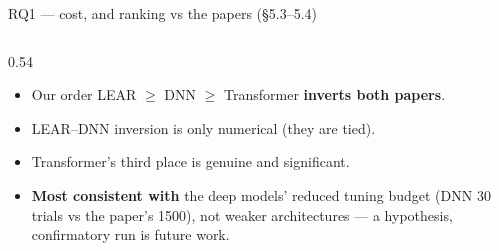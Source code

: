 \documentclass[aspectratio=169,10pt]{beamer}
\begin{document}
\begin{frame}{RQ1 --- cost, and ranking vs the papers \hfill\small(\S5.3--5.4)}
  \begin{columns}[T]
    \begin{column}{0.54\textwidth}
      \begin{itemize}\footnotesize
        \item Our order LEAR $\ge$ DNN $\ge$ Transformer \textbf{inverts both papers}.
        \item LEAR--DNN inversion is only numerical (they are tied).
        \item Transformer's third place is genuine and significant.
        \item \textbf{Most consistent with} the deep models' reduced tuning budget
          (DNN 30 trials vs the paper's 1500), not weaker architectures --- a hypothesis,
          confirmatory run is future work.
      \end{itemize}
    \end{column}
  \end{columns}
\end{frame}
\end{document}
